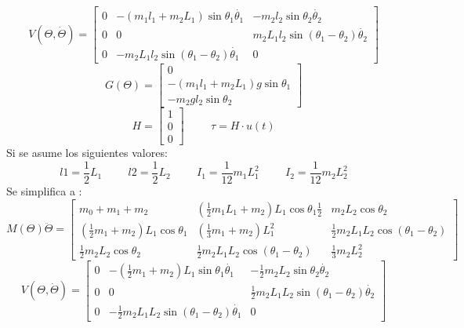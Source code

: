 \begin{equation}
 V\left( \Theta , \dot{\Theta} \right) =
 \begin{bmatrix}
0 & -\left( m_1l_1 + m_2L_1 \right)\sin \theta_1 \dot{\theta_1} & -m_2l_2\sin \theta_2 \dot{\theta_2}\\
0 & 0 & m_2L_1l_2\sin(\theta_1-\theta_2)\dot{\theta_2}\\
0 & -m_2L_1l_2\sin(\theta_1-\theta_2)\dot{\theta_1} & 0
\end{bmatrix}
\end{equation}
\begin{equation}
 G\left( \Theta \right) = \begin{bmatrix}
0 \\
 -(m_1l_1+m_2L_1)g\sin\theta_1 \\
-m_2gl_2\sin\theta_2
\end{bmatrix}
\end{equation}
\begin{equation}
 H = \begin{bmatrix}
1 \\
 0 \\
0
\end{bmatrix}
\hspace{1cm}
\tau = H\cdot u(t)
\end{equation}
Si se asume los siguientes valores:
\begin{equation}
l1 = \frac{1}{2} L_1
\hspace{1cm}
l2 = \frac{1}{2} L_2 
\hspace{1cm}
I_1 = \frac{1}{12} m_1L_1^2
\hspace{1cm}
I_2 = \frac{1}{12} m_2L_2^2
\end{equation}
Se simplifica a :
\begin{equation}
 M\left( \Theta \right)\ddot{\Theta} = \begin{bmatrix}
m_0+m_1+m_2 & \left( \frac{1}{2}m_1L_1 + m_2 \right) L_1\cos \theta_1  \frac{1}{2}& m_2L_2 \cos \theta_2\\

\left(  \frac{1}{2}m_1 + m_2 \right) L_1 \cos \theta_1  &
\left( \frac{1}{3}m_1+m_2\right) L_1^2
&  \frac{1}{2}m_2L_1L_2\cos(\theta_1-\theta_2)\\


 \frac{1}{2}m_2L_2\cos\theta_2 &  \frac{1}{2}m_2L_1L_2\cos(\theta_1-\theta_2) &  \frac{1}{3}m_2L_2^2
\end{bmatrix}
\end{equation}
\begin{equation}
 V\left( \Theta , \dot{\Theta} \right) =
 \begin{bmatrix}
0 & -\left(  \frac{1}{2}m_1 + m_2\right)L_1\sin \theta_1 \dot{\theta_1} & - \frac{1}{2}m_2L_2\sin \theta_2 \dot{\theta_2}\\
0 & 0 &  \frac{1}{2}m_2L_1L_2\sin(\theta_1-\theta_2)\dot{\theta_2}\\
0 & - \frac{1}{2}m_2L_1L_2\sin(\theta_1-\theta_2)\dot{\theta_1} & 0
\end{bmatrix}
\end{equation}
